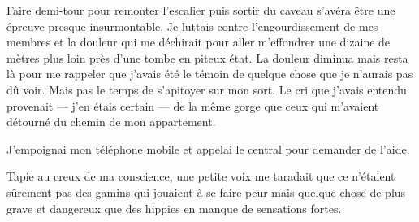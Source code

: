 Faire demi-tour pour remonter l'escalier puis sortir du caveau s'avéra être une épreuve presque insurmontable. Je 
luttais contre l'engourdissement de mes membres et la douleur qui me déchirait pour aller m'effondrer une dizaine de 
mètres plus loin près d'une tombe en piteux état. La douleur diminua mais resta là pour me rappeler que j'avais été le 
témoin de quelque chose que je n'aurais pas dû voir. Mais pas le temps de s'apitoyer sur mon sort. Le cri que j'avais 
entendu provenait — j'en étais certain — de la même gorge que ceux qui m'avaient détourné du chemin de mon appartement.

J'empoignai mon téléphone mobile et appelai le central pour demander de l'aide.

Tapie au creux de ma conscience, une petite voix me taradait que ce n'étaient sûrement pas des gamins qui jouaient à se 
faire peur mais quelque chose de plus grave et dangereux que des hippies en manque de sensations fortes.
